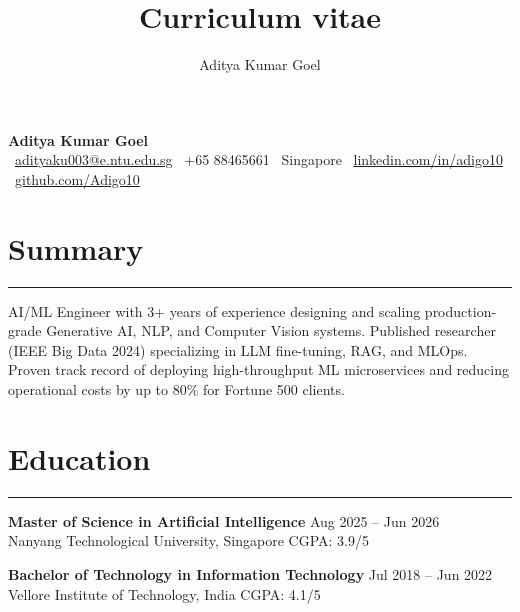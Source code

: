 \documentclass[9pt]{extarticle}
\title{Curriculum vitae}
\author{Aditya Kumar Goel}
\begin{document}
\begin{center}
    \textbf{\Huge Aditya Kumar Goel}
    \\ \vspace{2pt}
    \small
    \faEnvelope\ \href{mailto:adityaku003@e.ntu.edu.sg}{adityaku003@e.ntu.edu.sg} \hspace{3pt}
    \faPhone\ +65 88465661 \hspace{3pt}
    \faMapMarker\ Singapore \hspace{3pt}
    \faLinkedin\ \href{https://linkedin.com/in/adigo10}{linkedin.com/in/adigo10} \hspace{3pt}
    \faGithub\ \href{https://github.com/Adigo10}{github.com/Adigo10}
\end{center}

\vspace{-10pt}
\noindent\makebox[\linewidth]{\rule{\paperwidth}{0.4pt}}
\vspace{-15pt}

\section{Summary} \vspace{-6pt}\hrule\vspace{4pt}
AI/ML Engineer with 3+ years of experience designing and scaling production-grade Generative AI, NLP, and Computer Vision systems. Published researcher (IEEE Big Data 2024) specializing in LLM fine-tuning, RAG, and MLOps. Proven track record of deploying high-throughput ML microservices and reducing operational costs by up to 80\% for Fortune 500 clients.


\section{Education} \vspace{-6pt}\hrule\vspace{4pt}
\textbf{Master of Science in Artificial Intelligence} \hfill Aug 2025 -- Jun 2026 \\
Nanyang Technological University, Singapore \hfill CGPA: 3.9/5

\vspace{2pt}
\textbf{Bachelor of Technology in Information Technology} \hfill Jul 2018 -- Jun 2022 \\
Vellore Institute of Technology, India \hfill CGPA: 4.1/5

\end{document}
